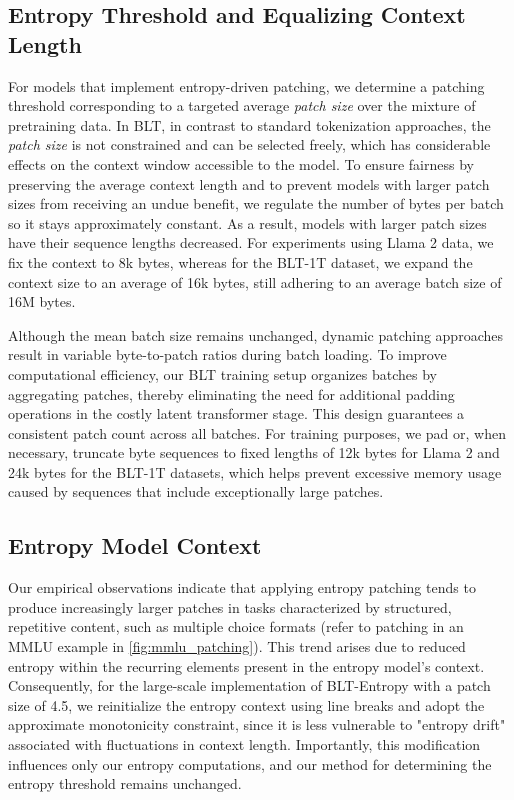 \subsection{Entropy Threshold and Equalizing Context Length} For models that implement entropy-driven patching, we determine a patching threshold corresponding to a targeted average \textit{patch size} over the mixture of pretraining data. In {\textsc BLT}, in contrast to standard tokenization approaches, the \textit{patch size} is not constrained and can be selected freely, which has considerable effects on the context window accessible to the model. To ensure fairness by preserving the average context length and to prevent models with larger patch sizes from receiving an undue benefit, we regulate the number of bytes per batch so it stays approximately constant. As a result, models with larger patch sizes have their sequence lengths decreased. For experiments using Llama 2 data, we fix the context to 8k bytes, whereas for the {\textsc BLT}-1T dataset, we expand the context size to an average of 16k bytes, still adhering to an average batch size of 16M bytes.

Although the mean batch size remains unchanged, dynamic patching approaches result in variable byte-to-patch ratios during batch loading. To improve computational efficiency, our {\textsc BLT} training setup organizes batches by aggregating patches, thereby eliminating the need for additional padding operations in the costly latent transformer stage. This design guarantees a consistent patch count across all batches. For training purposes, we pad or, when necessary, truncate byte sequences to fixed lengths of 12k bytes for Llama 2 and 24k bytes for the {\textsc BLT}-1T datasets, which helps prevent excessive memory usage caused by sequences that include exceptionally large patches.

\subsection{Entropy Model Context}
\label{section:entropy-context}
Our empirical observations indicate that applying entropy patching tends to produce increasingly larger patches in tasks characterized by structured, repetitive content, such as multiple choice formats (refer to patching in an MMLU example in \autoref{fig:mmlu_patching}). This trend arises due to reduced entropy within the recurring elements present in the entropy model's context. Consequently, for the large-scale implementation of {\textsc BLT}-Entropy with a patch size of 4.5, we reinitialize the entropy context using line breaks and adopt the approximate monotonicity constraint, since it is less vulnerable to "entropy drift" associated with fluctuations in context length. Importantly, this modification influences only our entropy computations, and our method for determining the entropy threshold remains unchanged.

